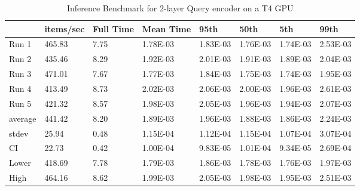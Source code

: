 \begin{table*}[!ht]
    \centering
    \begin{tabular}{|l|l|l|l|l|l|l|l|}
    \hline
        ~ & items/sec & Full Time & Mean Time & 95th & 50th & 5th & 99th \\ \hline
        Run 1 & 465.83 & 7.75 & 1.78E-03 & 1.83E-03 & 1.76E-03 & 1.74E-03 & 2.53E-03 \\ \hline
        Run 2 & 435.46 & 8.29 & 1.92E-03 & 2.01E-03 & 1.91E-03 & 1.89E-03 & 2.04E-03 \\ \hline
        Run 3 & 471.01 & 7.67 & 1.77E-03 & 1.84E-03 & 1.75E-03 & 1.74E-03 & 1.95E-03 \\ \hline
        Run 4 & 413.49 & 8.73 & 2.02E-03 & 2.06E-03 & 2.00E-03 & 1.96E-03 & 2.61E-03 \\ \hline
        Run 5 & 421.32 & 8.57 & 1.98E-03 & 2.05E-03 & 1.96E-03 & 1.94E-03 & 2.07E-03 \\ \hline
        average & 441.42 & 8.20 & 1.89E-03 & 1.96E-03 & 1.88E-03 & 1.86E-03 & 2.24E-03 \\ \hline
        stdev & 25.94 & 0.48 & 1.15E-04 & 1.12E-04 & 1.15E-04 & 1.07E-04 & 3.07E-04 \\ \hline
        CI & 22.73 & 0.42 & 1.00E-04 & 9.83E-05 & 1.01E-04 & 9.34E-05 & 2.69E-04 \\ \hline
        Lower & 418.69 & 7.78 & 1.79E-03 & 1.86E-03 & 1.78E-03 & 1.76E-03 & 1.97E-03 \\ \hline
        High & 464.16 & 8.62 & 1.99E-03 & 2.05E-03 & 1.98E-03 & 1.95E-03 & 2.51E-03 \\ \hline
    \end{tabular}
    \caption{Inference Benchmark for 2-layer Query encoder on a T4 GPU}
    \label{tab:benchmark-gpu-2layer}
\end{table*}

